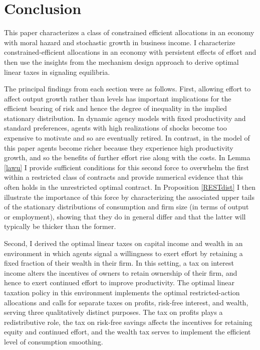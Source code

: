 \documentclass[11pt]{article}
\theoremstyle{plain}
\begin{document}
\section{Conclusion} \label{Conc}


This paper characterizes a class of constrained efficient allocations in an economy with moral hazard and stochastic growth in business income. I characterize constrained-efficient allocations in an economy with persistent effects of effort and then use the insights from the mechanism design approach to derive optimal linear taxes in signaling equilibria. 

The principal findings from each section were as follows. First, allowing effort to affect output growth rather than levels has important implications for the efficient bearing of risk and hence the degree of inequality in the implied stationary distribution. In dynamic agency models with fixed productivity and standard preferences, agents with high realizations of shocks become too expensive to motivate and so are eventually retired. In contrast, in the model of this paper agents become richer because they experience high productivity growth, and so the benefits of further effort rise along with the costs. In Lemma \ref{lawu} I provide sufficient conditions for this second force to overwhelm the first within a restricted class of contracts and provide numerical evidence that this often holds in the unrestricted optimal contract. In Proposition \ref{RESTdist} I then illustrate the importance of this force by characterizing the associated upper tails of the stationary distributions of consumption and firm size (in terms of output or employment), showing that they do in general differ and that the latter will typically be thicker than the former. 

Second, I derived the optimal linear taxes on capital income and wealth in an environment in which agents signal a willingness to exert effort by retaining a fixed fraction of their wealth in their firm. In this setting, a tax on interest income alters the incentives of owners to retain ownership of their firm, and hence to exert continued effort to improve productivity. The optimal linear taxation policy in this environment implements the optimal restricted-action allocations and calls for separate taxes on profits, risk-free interest, and wealth, serving three qualitatively distinct purposes. The tax on profits plays a redistributive role, the tax on risk-free savings affects the incentives for retaining equity and continued effort, and the wealth tax serves to implement the efficient level of consumption smoothing. 
\end{document}
